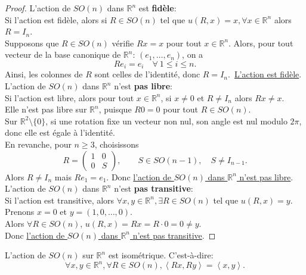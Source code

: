 \documentclass[12pt]{report}
\begin{document}
\begin{proof}
L'action de $SO(n)$ dans $\mathbb{R}^n$ est \textbf{fidèle}:\\
Si l'action est fidèle, alors si $R\in SO(n)$ tel que $u(R,x)=x, \forall x\in \mathbb{R}^n$ alors $R=I_n$.\\
Supposons que $R\in SO(n)$ vérifie $Rx=x$ pour tout $x\in \mathbb{R}^n$. Alors, pour tout vecteur de la base canonique de $\mathbb{R}^n$: $(e_1,\dots,e_n)$, on a
\[
Re_i = e_i \quad \forall~1\leq i\leq n.
\]
Ainsi, les colonnes de $R$ sont celles de l'identité, donc $R=I_n$.~\underline{L'action est fidèle}.\\

L'action de $SO(n)$ dans $\mathbb{R}^n$ n'est \textbf{pas libre}:\\
Si l'action est libre, alors pour tout $x\in \mathbb{R}^n$, si $x\neq 0$ et $R\neq I_n$ alors $Rx\neq x$.\\
Elle n'est pas libre sur $\mathbb R^n$, puisque $R0=0$ pour tout $R\in SO(n)$.\\
Sur $\mathbb R^2\setminus\{0\}$, si une rotation fixe un vecteur non nul, son angle est nul modulo $2\pi$, donc elle est égale à l'identité.\\
En revanche, pour $n\geq3$, choisissons
\[
R=\begin{pmatrix}1&0\\0&S\end{pmatrix}, \qquad S\in SO(n-1),\quad S\neq I_{n-1}.
\]
Alors $R\neq I_n$ mais $Re_1=e_1$. Donc \underline{l'action de $SO(n)$ dans $\mathbb{R}^n$ n'est pas libre}.\\

L'action de $SO(n)$ dans $\mathbb{R}^n$ n'est \textbf{pas transitive}:\\
Si l'action est transitive, alors $\forall x,y\in \mathbb{R}^n, \exists R\in SO(n)$ tel que $u(R,x)=y$.\\
Prenons $x=0$ et $y=(1,0,\dots ,0)$.\\
Alors $\forall R\in SO(n)$, $u(R,x)=Rx=R\cdot 0=0\neq y$.\\
Donc \underline{l'action de $SO(n)$ dans $\mathbb{R}^n$ n'est pas transitive}.
\end{proof}

\begin{proposition}
L'action de $SO(n)$ sur $\mathbb{R}^n$ est isométrique. C'est-à-dire:
\[
\forall x,y\in \mathbb{R}^n, \forall R\in SO(n), \left\langle Rx,Ry\right\rangle=\left\langle x,y\right\rangle.
\]
\end{proposition}
\end{document}
